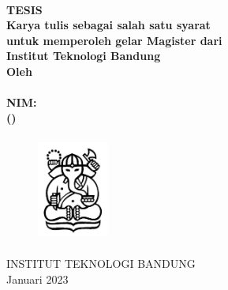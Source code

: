 \begin{titlepage}
  \label{chp:judul}
  \centering\bfseries\large
  \MakeUppercase{\titlename} \\
  TESIS \\
  \vspace{\baselineskip}
  \normalsize Karya tulis sebagai salah satu syarat \\
  untuk memperoleh gelar Magister dari \\
  Institut Teknologi Bandung\\
  Oleh \\ \large
  \MakeUppercase{\authorname} \\
  NIM: \authorid \\
  (\department) \\
  \begin{figure}[!h]
    \centering
    \includegraphics[width=2.35cm,height=3.5cm]{gbr/gajah.jpg}
  \end{figure}
  INSTITUT TEKNOLOGI BANDUNG \\
  Januari 2023
\end{titlepage}
